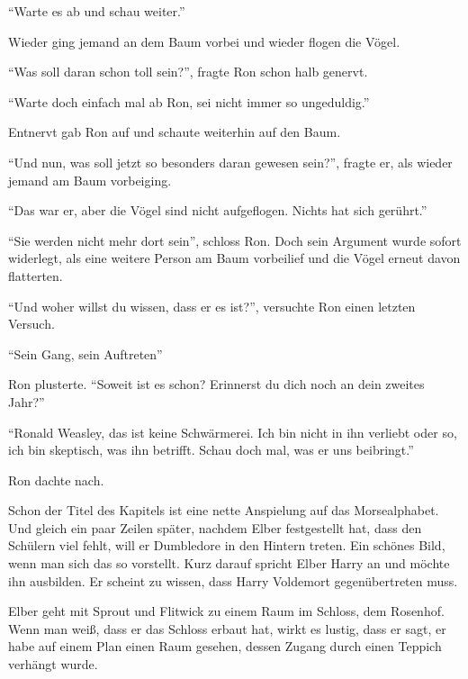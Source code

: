 \enquote{Warte es ab und schau weiter.}

Wieder ging jemand an dem Baum vorbei und wieder flogen die Vögel.

\enquote{Was soll daran schon toll sein?}, fragte Ron schon halb genervt.

\enquote{Warte doch einfach mal ab Ron, sei nicht immer so ungeduldig.}

Entnervt gab Ron auf und schaute weiterhin auf den Baum.

\enquote{Und nun, was soll jetzt so besonders daran gewesen sein?}, fragte er, als wieder jemand am Baum vorbeiging.

\enquote{Das war er, aber die Vögel sind nicht aufgeflogen. Nichts hat sich gerührt.}

\enquote{Sie werden nicht mehr dort sein}, schloss Ron. Doch sein Argument wurde sofort widerlegt, als eine weitere Person am Baum vorbeilief und die Vögel erneut davon flatterten.

\enquote{Und woher willst du wissen, dass er es ist?}, versuchte Ron einen letzten Versuch.

\enquote{Sein Gang, sein Auftreten\abs}

Ron plusterte. \enquote{Soweit ist es schon? Erinnerst du dich noch an dein zweites Jahr?}

\enquote{Ronald Weasley, das ist keine Schwärmerei. Ich bin nicht in ihn verliebt oder so, ich bin skeptisch, was ihn betrifft. Schau doch mal, was er uns beibringt.}

Ron dachte nach.




\begin{kommentar}
Schon der Titel des Kapitels ist eine nette Anspielung auf das Morsealphabet. Und gleich ein paar Zeilen später, nachdem Elber festgestellt hat, dass den Schülern viel fehlt, will er Dumbledore in den Hintern treten. Ein schönes Bild, wenn man sich das so vorstellt. Kurz darauf spricht Elber Harry an und möchte ihn ausbilden. Er scheint zu wissen, dass Harry Voldemort gegenübertreten muss.
\end{kommentar}

\begin{kommentar}
Elber geht mit Sprout und Flitwick zu einem Raum im Schloss, dem Rosenhof. Wenn man weiß, dass er das Schloss erbaut hat, wirkt es lustig, dass er sagt, er habe auf einem Plan einen Raum gesehen, dessen Zugang durch einen Teppich verhängt wurde.
\end{kommentar}
